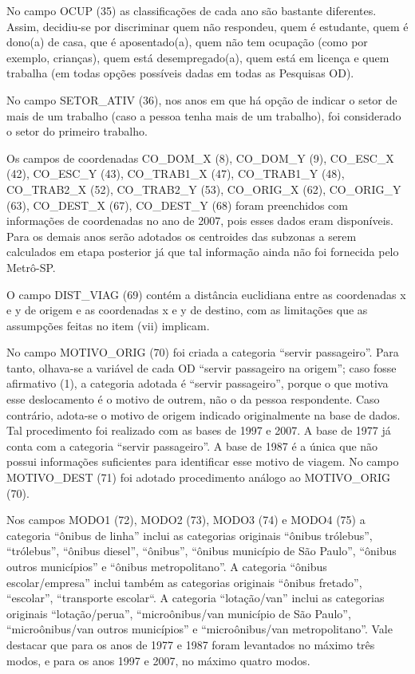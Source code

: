 No campo OCUP (35) as classificações de cada ano são bastante diferentes. Assim, decidiu-se por discriminar quem não respondeu, quem é estudante, quem é dono(a) de casa, que é aposentado(a), quem não tem ocupação (como por exemplo, crianças), quem está desempregado(a), quem está em licença e quem trabalha (em todas opções possíveis dadas em todas as Pesquisas OD).

No campo SETOR_ATIV (36), nos anos em que há opção de indicar o setor de mais de um trabalho (caso a pessoa tenha mais de um trabalho), foi considerado o setor do primeiro trabalho.

Os campos de coordenadas CO_DOM_X (8), CO_DOM_Y (9), CO_ESC_X (42), CO_ESC_Y (43), CO_TRAB1_X (47), CO_TRAB1_Y (48), CO_TRAB2_X (52), CO_TRAB2_Y (53), CO_ORIG_X (62), CO_ORIG_Y (63), CO_DEST_X (67), CO_DEST_Y (68) foram preenchidos com informações de coordenadas no ano de 2007, pois esses dados eram disponíveis. Para os demais anos serão adotados os centroides das subzonas a serem calculados em etapa posterior já que tal informação ainda não foi fornecida pelo Metrô-SP.

O campo DIST_VIAG (69) contém a distância euclidiana entre as coordenadas x e y de origem e as coordenadas x e y de destino, com as limitações que as assumpções feitas no item (vii) implicam.

No campo MOTIVO_ORIG (70) foi criada a categoria ``servir passageiro''. Para tanto, olhava-se a variável de cada OD ``servir passageiro na origem''; caso fosse afirmativo (1), a categoria adotada é ``servir passageiro'', porque o que motiva esse deslocamento é o motivo de outrem, não o da pessoa respondente. Caso contrário, adota-se o motivo de origem indicado originalmente na base de dados. Tal procedimento foi realizado com as bases de 1997 e 2007. A base de 1977 já conta com a categoria ``servir passageiro''. A base de 1987 é a única que não possui informações suficientes para identificar esse motivo de viagem. No campo MOTIVO_DEST (71) foi adotado procedimento análogo ao MOTIVO_ORIG (70).

Nos campos MODO1 (72), MODO2 (73), MODO3 (74) e MODO4 (75) a categoria ``ônibus de linha'' inclui as categorias originais ``ônibus trólebus'', ``trólebus'', ``ônibus diesel'', ``ônibus'', ``ônibus município de São Paulo'', ``ônibus outros municípios'' e ``ônibus metropolitano''. A categoria ``ônibus escolar/empresa'' inclui também as categorias originais ``ônibus fretado'', ``escolar'', ``transporte escolar``. A categoria ``lotação/van'' inclui as categorias originais ``lotação/perua'', ``microônibus/van município de São Paulo'', ``microônibus/van outros municípios'' e ``microônibus/van metropolitano''. Vale destacar que para os anos de 1977 e 1987 foram levantados no máximo três modos, e para os anos 1997 e 2007, no máximo quatro modos.







